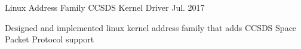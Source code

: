

\begin{cventries}

  \cventry
  {Linux Address Family} %
  {CCSDS Kernel Driver} %
  {} %
  {Jul. 2017} %
    {
      \begin{cvitems} %
      \item {Designed and implemented linux kernel address family that adds CCSDS Space Packet Protocol support}
      \end{cvitems}
    }

\end{cventries}
